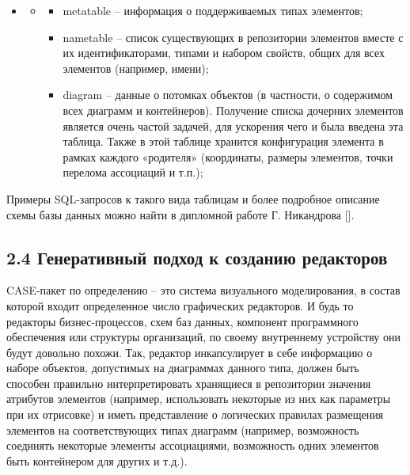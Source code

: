 \documentclass[a4paper]{article}
\newcommand\liststyleWWviiiNumx{%
\renewcommand\labelitemi{[F0B7?]}
\renewcommand\labelitemii{o}
\renewcommand\labelitemiii{[F0B7?]}
\renewcommand\labelitemiv{[F0B7?]}
}
\begin{document}
\liststyleWWviiiNumx
\begin{itemize}
\item \begin{itemize}
\item \begin{itemize}
\item {
\foreignlanguage{english}{metatable} – информация о поддерживаемых типах
элементов;}
\item {
\foreignlanguage{english}{nametable} – список существующих в репозитории
элементов вместе с их идентификаторами, типами и набором свойств, общих
для всех элементов (например, имени);}
\item {
\foreignlanguage{english}{diagram} – данные о потомках объектов (в
частности, о содержимом всех диаграмм и контейнеров). Получение списка
дочерних элементов является очень частой задачей, для ускорения чего и
была введена эта таблица. Также в этой таблице хранится конфигурация
элемента в рамках каждого «родителя» (координаты, размеры элементов,
точки перелома ассоциаций и т.п.);}
\end{itemize}
\end{itemize}
\end{itemize}
{
Примеры \foreignlanguage{english}{SQL}{}-запросов к такого вида таблицам
и более подробное описание схемы базы данных можно найти в дипломной
работе Г. Никандрова [].}


\bigskip

\subsection{2.4 Генеративный подход к созданию редакторов}
{
\foreignlanguage{english}{CASE}{}-пакет по определению – это система
визуального моделирования, в состав которой входит определенное число
графических редакторов. И будь то редакторы бизнес-процессов, схем баз
данных, компонент программного обеспечения или структуры организаций,
по своему внутреннему устройству они будут довольно похожи. Так,
редактор инкапсулирует в себе информацию о наборе объектов, допустимых
на диаграммах данного типа, должен быть способен правильно
интерпретировать хранящиеся в репозитории значения атрибутов элементов
(например, использовать некоторые из них как параметры при их
отрисовке) и иметь представление о логических правилах размещения
элементов на соответствующих типах диаграмм (например, возможность
соединять некоторые элементы ассоциациями, возможность одних элементов
быть контейнером для других и т.д.). }
\end{document}
